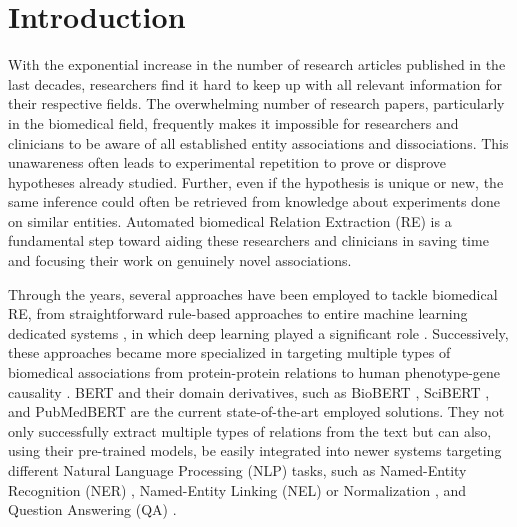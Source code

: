 \section{Introduction}

With the exponential increase in the number of research articles published in the last decades, researchers find it hard to keep up with all relevant information for their respective fields. The overwhelming number of research papers, particularly in the biomedical field, frequently makes it impossible for researchers and clinicians to be aware of all established entity associations and dissociations. This unawareness often leads to experimental repetition to prove or disprove hypotheses already studied. Further, even if the hypothesis is unique or new, the same inference could often be retrieved from knowledge about experiments done on similar entities. Automated biomedical Relation Extraction (RE) is a fundamental step toward aiding these researchers and clinicians in saving time and focusing their work on genuinely novel associations.

Through the years, several approaches have been employed to tackle biomedical RE, from straightforward rule-based approaches \citep{rinaldi2007mining,kilicoglu2020broad} to entire machine learning dedicated systems \citep{houssein2021machine,abdelkader2021machine}, in which deep learning played a significant role \citep{dash2020deep}. Successively, these approaches became more specialized in targeting multiple types of biomedical associations from protein-protein relations \citep{kim2006biocontrasts} to human phenotype-gene causality \citep{song2019leveraging,sousa2022biomedical}. BERT \citep{devlin2019bert} and their domain derivatives, such as BioBERT \citep{lee2020biobert}, SciBERT \citep{scibert}, and PubMedBERT \citep{gu2021domain} are the current state-of-the-art employed solutions. They not only successfully extract multiple types of relations from the text but can also, using their pre-trained models, be easily integrated into newer systems targeting different Natural Language Processing (NLP) tasks, such as Named-Entity Recognition (NER) \citep{nasar2021named}, Named-Entity Linking (NEL) or Normalization \citep{ruas2022nilinker}, and Question Answering (QA) \citep{do2022developing}.

